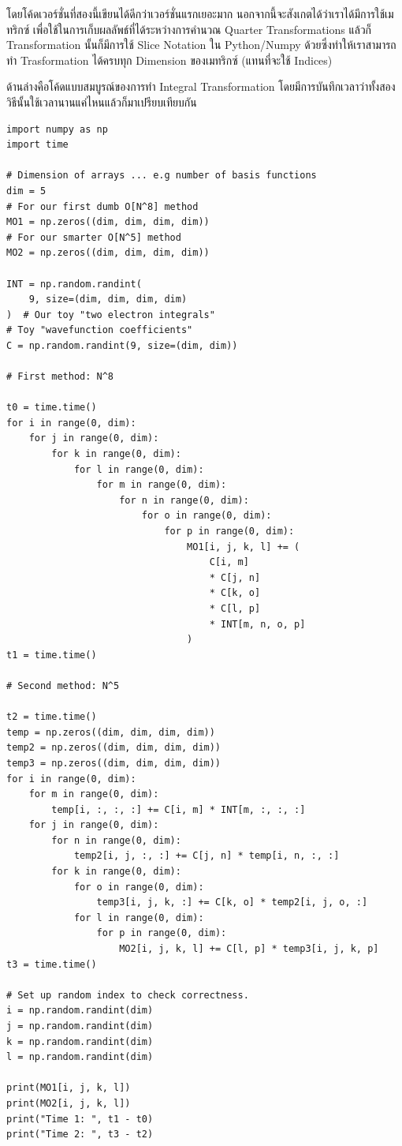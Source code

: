 \vspace{5pt}

\noindent โดยโค้ดเวอร์ชั่นที่สองนี้เขียนได้ดีกว่าเวอร์ชั่นแรกเยอะมาก นอกจากนี้จะสังเกตได้ว่าเราได้มีการใช้เมทริกซ์ 
เพื่อใช้ในการเก็บผลลัพธ์ที่ได้ระหว่างการคำนวณ Quarter Transformations แล้วก็ Transformation นั้นก็มีการใช้ Slice Notation
ใน Python/Numpy ด้วยซึ่งทำให้เราสามารถทำ Trasformation ได้ครบทุก Dimension ของเมทริกซ์ (แทนที่จะใช้ Indices)

ด้านล่างคือโค้ดแบบสมบูรณ์ของการทำ Integral Transformation โดยมีการบันทึกเวลาว่าทั้งสองวิธีนั้นใช้เวลานานแค่ไหนแล้วก็มาเปรียบเทียบกัน

\vspace{5pt}

\begin{lstlisting}[style=MyPython]
import numpy as np
import time

# Dimension of arrays ... e.g number of basis functions
dim = 5
# For our first dumb O[N^8] method
MO1 = np.zeros((dim, dim, dim, dim))  
# For our smarter O[N^5] method
MO2 = np.zeros((dim, dim, dim, dim))  

INT = np.random.randint(
    9, size=(dim, dim, dim, dim)
)  # Our toy "two electron integrals"
# Toy "wavefunction coefficients"
C = np.random.randint(9, size=(dim, dim))  

# First method: N^8

t0 = time.time()
for i in range(0, dim):
    for j in range(0, dim):
        for k in range(0, dim):
            for l in range(0, dim):
                for m in range(0, dim):
                    for n in range(0, dim):
                        for o in range(0, dim):
                            for p in range(0, dim):
                                MO1[i, j, k, l] += (
                                    C[i, m]
                                    * C[j, n]
                                    * C[k, o]
                                    * C[l, p]
                                    * INT[m, n, o, p]
                                )
t1 = time.time()

# Second method: N^5

t2 = time.time()
temp = np.zeros((dim, dim, dim, dim))
temp2 = np.zeros((dim, dim, dim, dim))
temp3 = np.zeros((dim, dim, dim, dim))
for i in range(0, dim):
    for m in range(0, dim):
        temp[i, :, :, :] += C[i, m] * INT[m, :, :, :]
    for j in range(0, dim):
        for n in range(0, dim):
            temp2[i, j, :, :] += C[j, n] * temp[i, n, :, :]
        for k in range(0, dim):
            for o in range(0, dim):
                temp3[i, j, k, :] += C[k, o] * temp2[i, j, o, :]
            for l in range(0, dim):
                for p in range(0, dim):
                    MO2[i, j, k, l] += C[l, p] * temp3[i, j, k, p]
t3 = time.time()

# Set up random index to check correctness.
i = np.random.randint(dim)
j = np.random.randint(dim)
k = np.random.randint(dim)
l = np.random.randint(dim)

print(MO1[i, j, k, l])
print(MO2[i, j, k, l])
print("Time 1: ", t1 - t0)
print("Time 2: ", t3 - t2)
\end{lstlisting}

